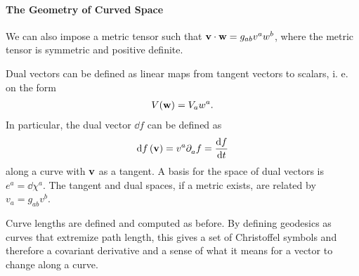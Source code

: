 \paragraph{The Geometry of Curved Space}
We can also impose a metric tensor such that $\vb{v}\cdot\vb{w} = g_{ab}v^{a}w^{b}$, where the metric tensor is symmetric and positive definite.

Dual vectors can be defined as linear maps from tangent vectors to scalars, i. e. on the form
\begin{align*}
	V(\vb{w}) = V_{a}w^{a}.
\end{align*}
In particular, the dual vector $\dd{f}$ can be defined as
\begin{align*}
	\dd{f}(\vb{v}) = v^{a}\partial^{}_{a}f = \dv{f}{t}
\end{align*}
along a curve with $\vb{v}$ as a tangent. A basis for the space of dual vectors is $e^{a} = \dd{\chi^{a}}$. The tangent and dual spaces, if a metric exists, are related by $v_{a} = g_{ab}v^{b}$.

Curve lengths are defined and computed as before. By defining geodesics as curves that extremize path length, this gives a set of Christoffel symbols and therefore a covariant derivative and a sense of what it means for a vector to change along a curve.